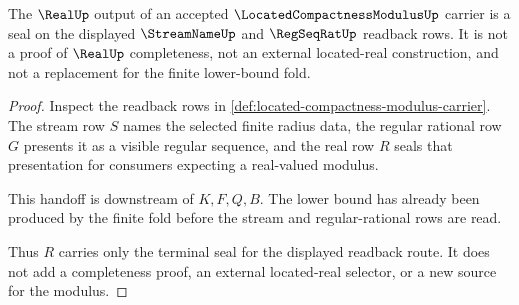 \begin{theorem}
\label{thm:located-compactness-modulus-real-handoff}
The $\RealUp$ output of an accepted $\LocatedCompactnessModulusUp$ carrier is a seal on the displayed $\StreamNameUp$ and $\RegSeqRatUp$ readback rows. It is not a proof of $\RealUp$ completeness, not an external located-real construction, and not a replacement for the finite lower-bound fold.
\end{theorem}
\begin{proof}
Inspect the readback rows in \autoref{def:located-compactness-modulus-carrier}. The stream row $S$ names the selected finite radius data, the regular rational row $G$ presents it as a visible regular sequence, and the real row $R$ seals that presentation for consumers expecting a real-valued modulus.

This handoff is downstream of $K,F,Q,B$. The lower bound has already been produced by the finite fold before the stream and regular-rational rows are read.

Thus $R$ carries only the terminal seal for the displayed readback route. It does not add a completeness proof, an external located-real selector, or a new source for the modulus.
\end{proof}




